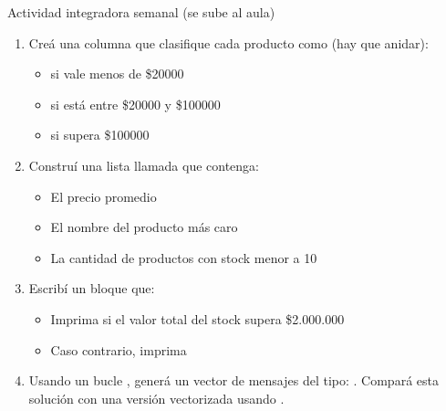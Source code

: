 \documentclass[8pt]{beamer}
\begin{document}
\begin{frame}[fragile]{Actividad integradora semanal (se sube al aula)}
	
	\begin{enumerate}[start=5]
		\item Creá una columna  que clasifique cada producto como (hay que anidar):
		\begin{itemize}
			\item {} si vale menos de \$20000
			\item {} si está entre \$20000 y \$100000
			\item {} si supera \$100000
		\end{itemize}
		
		\item Construí una lista llamada  que contenga:
		\begin{itemize}
			\item El precio promedio
			\item El nombre del producto más caro
			\item La cantidad de productos con stock menor a 10
		\end{itemize}
		
		\item Escribí un bloque  que:
		\begin{itemize}
			\item Imprima  si el valor total del stock supera \$2.000.000
			\item Caso contrario, imprima 
		\end{itemize}
		
		\item Usando un bucle , generá un vector de mensajes del tipo:
		.
		Compará esta solución con una versión vectorizada usando .
	\end{enumerate}
\end{frame}
\end{document}
